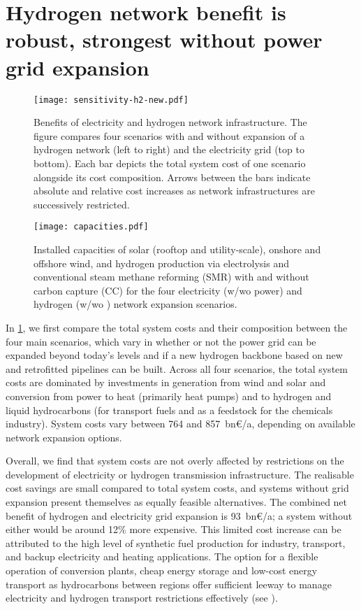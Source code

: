 \section*{Hydrogen network benefit is robust, strongest without power grid expansion}
\label{sec:h2}


\begin{figure}
    \centering
    \texttt{[image: sensitivity-h2-new.pdf]}
    \caption{Benefits of electricity and hydrogen network infrastructure. The
    figure compares four scenarios with and without expansion of a hydrogen
    network (left to right) and the electricity grid (top to bottom). Each bar
    depicts the total system cost of one scenario alongside its cost
    composition. Arrows between the bars indicate absolute and relative cost
    increases as network infrastructures are successively restricted.}
    \label{fig:sensitivity-h2}
\end{figure}

\begin{figure}
    \centering
    \texttt{[image: capacities.pdf]}
    \caption{Installed capacities of solar (rooftop and utility-scale), onshore
    and offshore wind, and hydrogen production via electrolysis and conventional steam
    methane reforming (SMR) with and without carbon capture (CC) for the four
    electricity (w/wo power) and hydrogen (w/wo ) network expansion scenarios.}
    \label{fig:capacities}
\end{figure}

In \cref{fig:sensitivity-h2}, we first compare the total system costs and their
composition between the four main scenarios, which vary in whether or not the
power grid can be expanded beyond today's levels and if a new hydrogen backbone
based on new and retrofitted pipelines can be built. Across all four scenarios,
the total system costs are dominated by investments in generation from wind and
solar and conversion from power to heat (primarily heat pumps) and to hydrogen
and liquid hydrocarbons (for transport fuels and as a feedstock for the
chemicals industry). System costs vary between 764 and 857~bn\euro/a, depending
on available network expansion options.

Overall, we find that system costs are not overly affected by restrictions on
the development of electricity or hydrogen transmission infrastructure. The
realisable cost savings are small compared to total system costs, and systems
without grid expansion present themselves as equally feasible alternatives. The
combined net benefit of hydrogen and electricity grid expansion is 93~bn\euro/a;
a system without either would be around 12\% more expensive. This limited cost
increase can be attributed to the high level of synthetic fuel production for
industry, transport, and backup electricity and heating applications. The option
for a flexible operation of conversion plants, cheap energy storage and low-cost
energy transport as hydrocarbons between regions offer sufficient leeway to
manage electricity and hydrogen transport restrictions effectively (see ).

